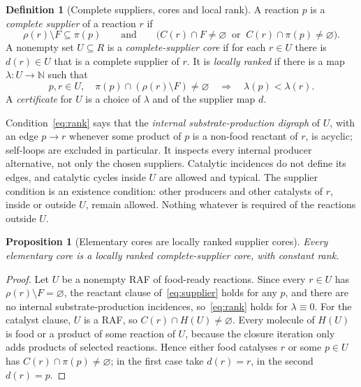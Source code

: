 \documentclass[11pt,a4paper]{article}
\theoremstyle{plain}
\newtheorem{proposition}[theorem]{Proposition}
\theoremstyle{definition}
\newtheorem{definition}[theorem]{Definition}
\theoremstyle{remark}
\newcommand{\N}{\mathbb N}
\begin{document}
\begin{definition}[Complete suppliers, cores and local rank]\label{def:core}
A reaction $p$ is a \emph{complete supplier} of a reaction $r$ if
\begin{equation}\label{eq:supplier}
 \rho(r)\setminus F\subseteq\pi(p)\qquad\text{and}\qquad
 \bigl(C(r)\cap F\ne\varnothing\ \text{ or }\ C(r)\cap\pi(p)\ne\varnothing\bigr).
\end{equation}
A nonempty set $U\subseteq R$ is a \emph{complete-supplier core} if for each $r\in U$ there is $d(r)\in U$ that is a complete supplier of $r$. It is \emph{locally ranked} if there is a map $\lambda:U\to\N$ such that
\begin{equation}\label{eq:rank}
 p,r\in U,\quad \pi(p)\cap(\rho(r)\setminus F)\ne\varnothing
 \quad\Longrightarrow\quad\lambda(p)<\lambda(r).
\end{equation}
A \emph{certificate} for $U$ is a choice of $\lambda$ and of the supplier map $d$.
\end{definition}

Condition~\eqref{eq:rank} says that the \emph{internal substrate-production digraph} of $U$, with an edge $p\to r$ whenever some product of $p$ is a non-food reactant of $r$, is acyclic; self-loops are excluded in particular. It inspects every internal producer alternative, not only the chosen suppliers. Catalytic incidences do not define its edges, and catalytic cycles inside $U$ are allowed and typical. The supplier condition is an existence condition: other producers and other catalysts of $r$, inside or outside $U$, remain allowed. Nothing whatever is required of the reactions outside $U$.

\begin{proposition}[Elementary cores are locally ranked supplier cores]\label{prop:elementary}
Every elementary core is a locally ranked complete-supplier core, with constant rank.
\end{proposition}
\begin{proof}
Let $U$ be a nonempty RAF of food-ready reactions. Since every $r\in U$ has $\rho(r)\setminus F=\varnothing$, the reactant clause of~\eqref{eq:supplier} holds for any $p$, and there are no internal substrate-production incidences, so~\eqref{eq:rank} holds for $\lambda\equiv0$. For the catalyst clause, $U$ is a RAF, so $C(r)\cap H(U)\ne\varnothing$. Every molecule of $H(U)$ is food or a product of some reaction of $U$, because the closure iteration only adds products of selected reactions. Hence either food catalyses $r$ or some $p\in U$ has $C(r)\cap\pi(p)\ne\varnothing$; in the first case take $d(r)=r$, in the second $d(r)=p$.
\end{proof}
\end{document}
